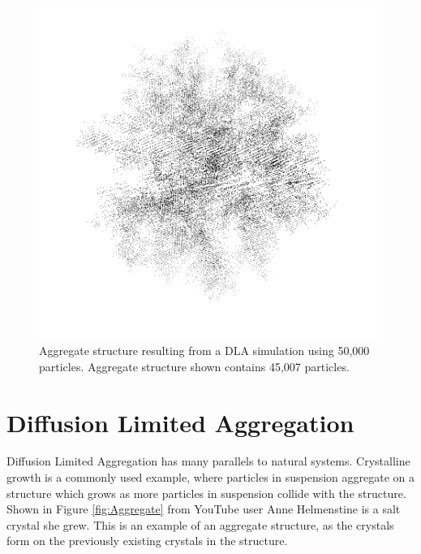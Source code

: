 \documentclass[fleqn,10pt]{UserGuideArx} %
\begin{document}
\begin{figure}[!h]\centering %
    \includegraphics[width=\linewidth]{images/DLA45007-2-BW.png}
    \caption{Aggregate structure resulting from a DLA simulation using 50,000 particles. Aggregate structure shown contains 45,007 particles.}
    \label{fig:DLA45007}
    \end{figure}

\section{Diffusion Limited Aggregation}
Diffusion Limited Aggregation has many parallels to natural systems. Crystalline growth is a commonly used example, where particles in suspension aggregate on a structure which grows as more particles in suspension collide with the structure. Shown in Figure \ref{fig:Aggregate} from YouTube user Anne Helmenstine \cite{Helmenstine:2011} is a salt crystal she grew. This is an example of an aggregate structure, as the crystals form on the previously existing crystals in the structure.
\end{document}
